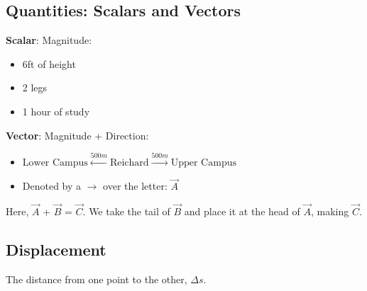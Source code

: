 \documentclass[../Notes.tex]{subfiles}
\begin{document}
    \subsection*{Quantities: Scalars and Vectors}

    \textbf{Scalar}: Magnitude:

    \begin{itemize}
        \item 6ft of height
        \item 2 legs
        \item 1 hour of study
    \end{itemize}

    \textbf{Vector}: Magnitude + Direction:
    
    \begin{itemize}
        \item $\boxed{\text{Lower Campus}} \xleftarrow{500m} \boxed{\text{Reichard}} \xrightarrow{500m} \boxed{\text{Upper Campus}}$
        \item Denoted by a $\rightarrow$ over the letter: $\stackrel{\rightarrow}{A}$
    \end{itemize}

        
    Here, $\stackrel{\rightarrow}{A}$ + $\stackrel{\rightarrow}{B}$ = $\stackrel{\rightarrow}{C}$. We take the tail of $\stackrel{\rightarrow}{B}$ and place it at the head of $\stackrel{\rightarrow}{A}$, making $\stackrel{\rightarrow}{C}$.
 
    \subsection*{Displacement}

        The distance from one point to the other, $\Delta s$.
\end{document}
